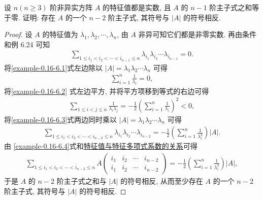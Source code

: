\documentclass[../../main.tex]{subfiles}%
\begin{document}
\begin{example}
设 $n (n \geqslant  3)$ 阶非异实方阵 $A$ 的特征值都是实数, 且 $A$ 的 $n-1$ 阶主子式之和等于零. 证明: 存在 $A$ 的一个 $n-2$ 阶主子式, 其符号与 $|A|$ 的符号相反.
\end{example}
\begin{proof}

设 $A$ 的特征值为 $\lambda_1, \lambda_2, \cdots, \lambda_n$, 由 $A$ 非异可知它们都是非零实数. 再由条件和例 6.24 可知
\begin{align}
\sum_{1 \leqslant  i_1 < i_2 < \cdots < i_{n-1} \leqslant  n} \lambda_{i_1} \lambda_{i_2} \cdots \lambda_{i_{n-1}} = 0.\label{example-0.16-6.1}
\end{align}
将\eqref{example-0.16-6.1}式左边除以 $|A| = \lambda_1 \lambda_2 \cdots \lambda_n$ 可得
\begin{align}
\sum_{i=1}^n \frac{1}{\lambda_i} = 0, \label{example-0.16-6.2}
\end{align}
将\eqref{example-0.16-6.2} 式左边平方, 并将平方项移到等式的右边可得
\begin{align}
\sum_{1 \leqslant  i < j \leqslant  n} \frac{1}{\lambda_i \lambda_j} = -\frac{1}{2} \left( \sum_{i=1}^n \frac{1}{\lambda_i} \right)^2 < 0, \label{example-0.16-6.3}
\end{align}
将\eqref{example-0.16-6.3}式两边同时乘以 $|A| = \lambda_1 \lambda_2 \cdots \lambda_n$ 可得
\begin{align}
\sum_{1 \leqslant  i_1 < i_2 < \cdots < i_{n-2} \leqslant  n} \lambda_{i_1} \lambda_{i_2} \cdots \lambda_{i_{n-2}} = -\frac{1}{2} \left( \sum_{i=1}^n \frac{1}{\lambda_i^2} \right) |A|. \label{example-0.16-6.4}
\end{align}
由 \eqref{example-0.16-6.4}式和\hyperref[proposition:特征值与特征多项式系数的关系]{特征值与特征多项式系数的关系}可得
\begin{align*}
\sum_{1 \leqslant  i_1 < i_2 < \cdots < i_{n-2} \leqslant  n} A \begin{pmatrix}
i_1 & i_2 & \cdots & i_{n-2} \\
i_1 & i_2 & \cdots & i_{n-2}
\end{pmatrix} = -\frac{1}{2} \left( \sum_{i=1}^n \frac{1}{\lambda_i^2} \right) |A|,
\end{align*}
于是 $A$ 的 $n-2$ 阶主子式之和与 $|A|$ 的符号相反, 从而至少存在 $A$ 的一个 $n-2$ 阶主子式, 其符号与 $|A|$ 的符号相反. 

\end{proof}
\end{document}

